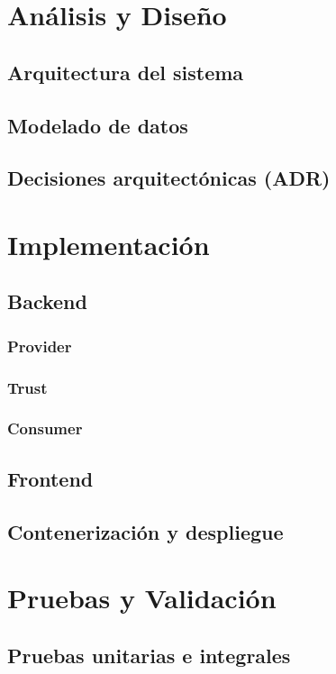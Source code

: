 \documentclass[spanish]{esi-tfg}
\begin{document}
\chapter{Análisis y Diseño}
\section{Arquitectura del sistema}
\section{Modelado de datos}
\section{Decisiones arquitectónicas (ADR)}

\chapter{Implementación}
\section{Backend}
\subsection{Provider}
\subsection{Trust}
\subsection{Consumer}
\section{Frontend}
\section{Contenerización y despliegue}

\chapter{Pruebas y Validación}
\section{Pruebas unitarias e integrales}
\end{document}
